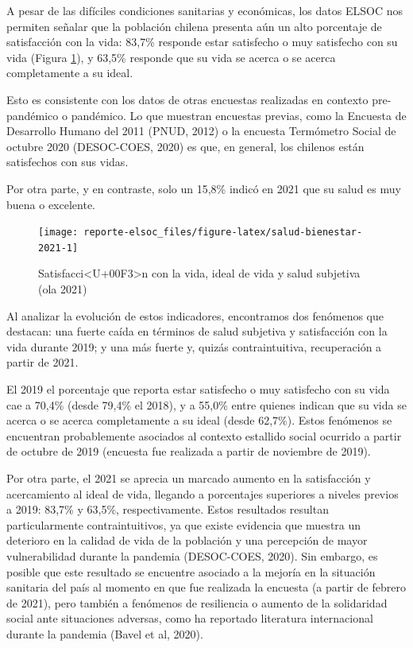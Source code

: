\documentclass[
  12pt,
]{book}
\begin{document}
A pesar de las difíciles condiciones sanitarias y económicas, los datos ELSOC nos permiten señalar que la población chilena presenta aún un alto porcentaje de satisfacción con la vida: 83,7\% responde estar satisfecho o muy satisfecho con su vida (Figura \ref{fig:salud-bienestar-2021}), y 63,5\% responde que su vida se acerca o se acerca completamente a su ideal.

Esto es consistente con los datos de otras encuestas realizadas en contexto pre-pandémico o pandémico. Lo que muestran encuestas previas, como la Encuesta de Desarrollo Humano del 2011 (PNUD, 2012) o la encuesta Termómetro Social de octubre 2020 (DESOC-COES, 2020) es que, en general, los chilenos están satisfechos con sus vidas.

Por otra parte, y en contraste, solo un 15,8\% indicó en 2021 que su salud es muy buena o excelente.

\begin{figure}

{\centering \texttt{[image: reporte-elsoc\_files/figure-latex/salud-bienestar-2021-1]} 

}

\caption{Satisfacci<U+00F3>n con la vida, ideal de vida y salud subjetiva (ola 2021)}\label{fig:salud-bienestar-2021}
\end{figure}

Al analizar la evolución de estos indicadores, encontramos dos fenómenos que destacan: una fuerte caída en términos de salud subjetiva y satisfacción con la vida durante 2019; y una más fuerte y, quizás contraintuitiva, recuperación a partir de 2021.

El 2019 el porcentaje que reporta estar satisfecho o muy satisfecho con su vida cae a 70,4\% (desde 79,4\% el 2018), y a 55,0\% entre quienes indican que su vida se acerca o se acerca completamente a su ideal (desde 62,7\%). Estos fenómenos se encuentran probablemente asociados al contexto estallido social ocurrido a partir de octubre de 2019 (encuesta fue realizada a partir de noviembre de 2019).

Por otra parte, el 2021 se aprecia un marcado aumento en la satisfacción y acercamiento al ideal de vida, llegando a porcentajes superiores a niveles previos a 2019: 83,7\% y 63,5\%, respectivamente. Estos resultados resultan particularmente contraintuitivos, ya que existe evidencia que muestra un deterioro en la calidad de vida de la población y una percepción de mayor vulnerabilidad durante la pandemia (DESOC-COES, 2020). Sin embargo, es posible que este resultado se encuentre asociado a la mejoría en la situación sanitaria del país al momento en que fue realizada la encuesta (a partir de febrero de 2021), pero también a fenómenos de resiliencia o aumento de la solidaridad social ante situaciones adversas, como ha reportado literatura internacional durante la pandemia (Bavel et al, 2020).
\end{document}
